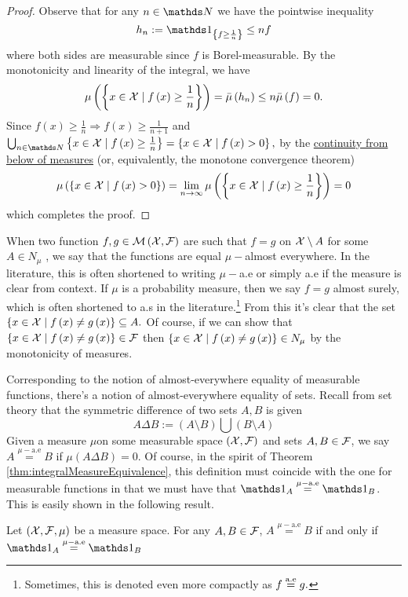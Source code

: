 \begin{proof}
Observe that for any $n\in\N$ we have the pointwise inequality
\[
h_{n}:=\indicate_{\left\{ f\geq\frac{1}{n}\right\} }\leq nf
\]
where both sides are measurable since $f$ is Borel-measurable. By
the monotonicity and linearity of the integral, we have 
\[
\mu\left(\left\{ x\in\mathcal{X}\mid f\left(x\right)\geq\frac{1}{n}\right\} \right)=\bar{\mu}\left(h_{n}\right)\leq n\bar{\mu}\left(f\right)=0.
\]
Since $f\left(x\right)\geq\frac{1}{n}\Longrightarrow f\left(x\right)\geq\frac{1}{n+1}$
and $\bigcup_{n\in\N}\left\{ x\in\X\mid f\left(x\right)\geq\frac{1}{n}\right\} =\left\{ x\in\X\mid f\left(x\right)>0\right\} ,$
by the \hyperref[prop:measureProperties]{continuity from below of measures}
(or, equivalently, the monotone convergence theorem)
\[
\mu\left(\left\{ x\in\mathcal{X}\mid f\left(x\right)>0\right\} \right)=\lim_{n\to\infty}\mu\left(\left\{ x\in\mathcal{X}\mid f\left(x\right)\geq\frac{1}{n}\right\} \right)=0
\]
which completes the proof.
\end{proof}
\begin{rem*}
When two function $f,g\in\mathcal{M}\left(\mathcal{X},\mathcal{F}\right)$ are such that $f=g$
on $\mathcal{X}\setminus A$ for some $A\in N_{\mu}$ , we say that the functions
are equal $\mu-$almost everywhere. In the literature, this is often
shortened to writing $\mu-$a.e or simply a.e if the measure is clear
from context. If $\mu$ is a probability measure, then we say $f=g$
almost surely, which is often shortened to a.s in the literature.\footnote{Sometimes, this is denoted even more compactly as $f\stackrel{\textnormal{a.e}}{=}g.$}
From this it's clear that the set $\left\{ x\in\mathcal{X}\mid f\left(x\right)\neq g\left(x\right)\right\} \subseteq A.$
Of course, if we can show that $\left\{ x\in\mathcal{X}\mid f\left(x\right)\neq g\left(x\right)\right\} \in\mathcal{F}$
then $\left\{ x\in\mathcal{X}\mid f\left(x\right)\neq g\left(x\right)\right\} \in N_{\mu}$
by the monotonicity of measures.

Corresponding to the notion of almost-everywhere equality of measurable
functions, there's a notion of almost-everywhere equality of sets.
Recall from set theory that the symmetric difference of two sets $A,B$
is given
\[
A\Delta B:=\left(A\setminus B\right)\bigcup\left(B\setminus A\right)
\]
Given a measure $\mu$on some measurable space $\left(\mathcal{X},\mathcal{F}\right)$
and sets $A,B\in\mathcal{F}$, we say $A\stackrel{\mu-\text{a.e}}{=}B$ if
$\mu\left(A\Delta B\right)=0.$ Of course, in the spirit of Theorem
\ref{thm:integralMeasureEquivalence}, this definition must coincide
with the one for measurable functions in that we must have that $\indicate_{A}\stackrel{\mu-\text{a.e}}{=}\indicate_{B}$.
This is easily shown in the following result.
\end{rem*}
\begin{prop}
\label{prop:almostEverywhereEqualSets}Let $\left(\mathcal{X},\mathcal{F},\mu\right)$ be a measure
space. For any $A,B\in\mathcal{F}$, $A\stackrel{\mu-\text{a.e}}{=}B$ if and
only if $\indicate_{A}\stackrel{\mu-\text{a.e}}{=}\indicate_{B}$
\end{prop}

